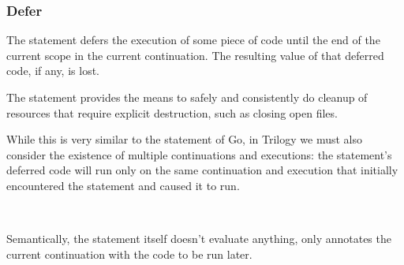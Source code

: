 \subsubsection{Defer}
\label{sec:prose-defer}

The  statement defers the execution of some piece of code until the
end of the current scope in the current continuation. The resulting value of
that deferred code, if any, is lost.

The  statement provides the means to safely and consistently do cleanup
of resources that require explicit destruction, such as closing open files.

While this is very similar to the  statement of Go, in Trilogy we must
also consider the existence of multiple continuations and executions: the 
statement's deferred code will run only on the same continuation and execution that
initially encountered the  statement and caused it to run.

\begin{bnf*}
     \\
\end{bnf*}

Semantically, the  statement itself doesn't evaluate anything, only annotates
the current continuation with the code to be run later.

\begin{prooftree}
\end{prooftree}

